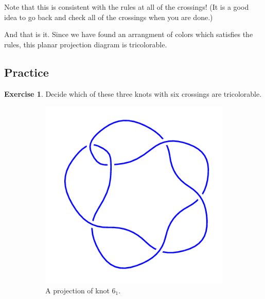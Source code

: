 \documentclass[12pt,letterpaper]{article}
\theoremstyle{definition}
\newtheorem{exercise}[question]{Exercise}
\begin{document}
Note that this is consistent with the rules at all of the crossings!
(It is a good idea to go back and check all of the crossings when you are done.)

And that is it.
Since we have found an arrangment of colors which satisfies the rules, this planar projection diagram is tricolorable.


\subsection*{Practice}

\begin{exercise}
Decide which of these three knots with six crossings are tricolorable.
\end{exercise}

\begin{figure}[h]
    \centering
    \begin{subfigure}{.3\textwidth}
        \centering
        \includegraphics[width=\textwidth]{knotpics/6_1.png}
        \caption{A projection of knot $6_1$.}
    \end{subfigure}
    \quad
    \begin{subfigure}{.3\textwidth}
        \centering

\end{subfigure}
\end{figure}
\end{document}
